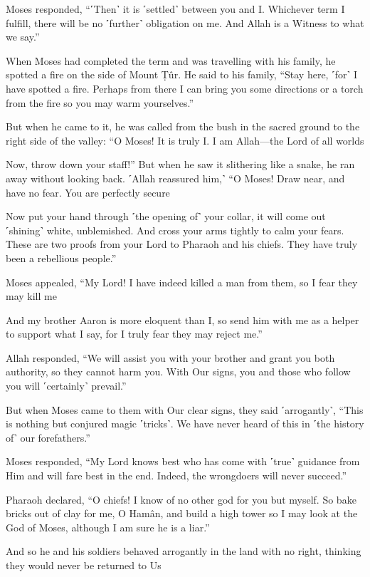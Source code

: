 Moses responded, “˹Then˺ it is ˹settled˺ between you and I. Whichever term I fulfill, there will be no ˹further˺ obligation on me. And Allah is a Witness to what we say.”

When Moses had completed the term and was travelling with his family, he spotted a fire on the side of Mount Ṭûr. He said to his family, “Stay here, ˹for˺ I have spotted a fire. Perhaps from there I can bring you some directions or a torch from the fire so you may warm yourselves.”

But when he came to it, he was called from the bush in the sacred ground to the right side of the valley: “O Moses! It is truly I. I am Allah—the Lord of all worlds

Now, throw down your staff!” But when he saw it slithering like a snake, he ran away without looking back. ˹Allah reassured him,˺ “O Moses! Draw near, and have no fear. You are perfectly secure

Now put your hand through ˹the opening of˺ your collar, it will come out ˹shining˺ white, unblemished. And cross your arms tightly to calm your fears. These are two proofs from your Lord to Pharaoh and his chiefs. They have truly been a rebellious people.”

Moses appealed, “My Lord! I have indeed killed a man from them, so I fear they may kill me

And my brother Aaron is more eloquent than I, so send him with me as a helper to support what I say, for I truly fear they may reject me.”

Allah responded, “We will assist you with your brother and grant you both authority, so they cannot harm you. With Our signs, you and those who follow you will ˹certainly˺ prevail.”

But when Moses came to them with Our clear signs, they said ˹arrogantly˺, “This is nothing but conjured magic ˹tricks˺. We have never heard of this in ˹the history of˺ our forefathers.”

Moses responded, “My Lord knows best who has come with ˹true˺ guidance from Him and will fare best in the end. Indeed, the wrongdoers will never succeed.”

Pharaoh declared, “O chiefs! I know of no other god for you but myself. So bake bricks out of clay for me, O Hamân, and build a high tower so I may look at the God of Moses, although I am sure he is a liar.”

And so he and his soldiers behaved arrogantly in the land with no right, thinking they would never be returned to Us


